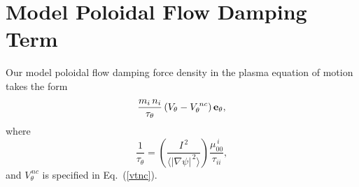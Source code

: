 \documentclass[12pt]{article}
\begin{document}
\section{Model Poloidal Flow Damping Term}
Our model poloidal flow damping force density in the plasma equation of motion takes the form
\begin{equation}
\frac{m_i\,n_i}{\tau_\theta}\,(V_\theta - V_\theta^{\,nc})\,{\bf e}_\theta,
\end{equation}
where		
\begin{equation}
\frac{1}{\tau_\theta} = \left(\frac{I^{\,2}}{\langle |\nabla\psi|^{\,2}\rangle}\right)\frac{\mu_{00}^{\,i}}{\tau_{ii}},
\end{equation}
and $V_\theta^{\,nc}$ is specified in Eq.~(\ref{vtnc}).
\end{document}
